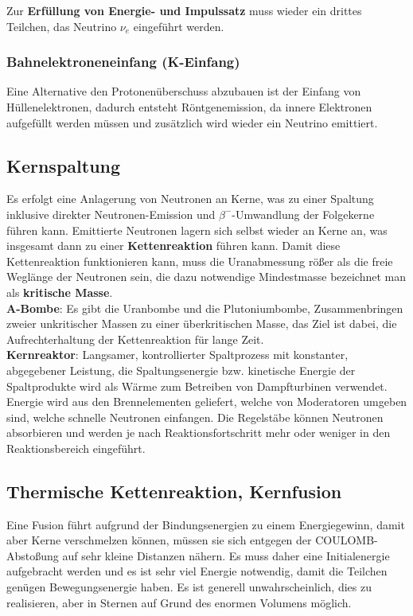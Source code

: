 \documentclass[12pt,a4paper,ngerman]{article}
\begin{document}
Zur \textbf{Erfüllung von Energie- und Impulssatz} muss wieder ein drittes Teilchen, das Neutrino $\nu_e$ eingeführt werden. 

\subsubsection*{Bahnelektroneneinfang (K-Einfang)}
Eine Alternative den Protonenüberschuss abzubauen ist der Einfang von Hüllenelektronen, dadurch entsteht Röntgenemission, da innere Elektronen aufgefüllt werden müssen und zusätzlich wird wieder ein Neutrino emittiert. 


\subsection{Kernspaltung}
Es erfolgt eine Anlagerung von Neutronen an Kerne, was zu einer Spaltung inklusive direkter Neutronen-Emission und $\beta^-$-Umwandlung der Folgekerne führen kann. Emittierte Neutronen lagern sich selbst wieder an Kerne an, was insgesamt dann zu einer \textbf{Kettenreaktion} führen kann. Damit diese Kettenreaktion funktionieren kann, muss die Uranabmessung rößer als die freie Weglänge der Neutronen sein, die dazu notwendige Mindestmasse bezeichnet man als \textbf{kritische Masse}. \pagebreak \\
\textbf{A-Bombe}: Es gibt die Uranbombe und die Plutoniumbombe, Zusammenbringen zweier unkritischer Massen zu einer überkritischen Masse, das Ziel ist dabei, die Aufrechterhaltung der Kettenreaktion für lange Zeit. \\
\textbf{Kernreaktor}: Langsamer, kontrollierter Spaltprozess mit konstanter, abgegebener Leistung, die Spaltungsenergie bzw. kinetische Energie der Spaltprodukte wird als Wärme zum Betreiben von Dampfturbinen verwendet. 
Energie wird aus den Brennelementen geliefert, welche von Moderatoren umgeben sind, welche schnelle Neutronen einfangen. Die Regelstäbe können Neutronen absorbieren und werden je nach Reaktionsfortschritt mehr oder weniger in den Reaktionsbereich eingeführt. 

\subsection{Thermische Kettenreaktion, Kernfusion}
Eine Fusion führt aufgrund der Bindungsenergien zu einem Energiegewinn, damit aber Kerne verschmelzen können, müssen sie sich entgegen der COULOMB-Abstoßung auf sehr kleine Distanzen nähern. Es muss daher eine Initialenergie aufgebracht werden und es ist sehr viel Energie notwendig, damit die Teilchen genügen Bewegungsenergie haben. Es ist generell unwahrscheinlich, dies zu realisieren, aber in Sternen auf Grund des enormen Volumens möglich. 
\end{document}
